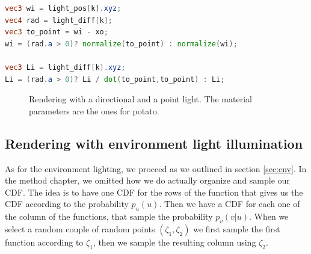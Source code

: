\begin{lstlisting}[language=GLSL,label=lst:multilighttype,caption={GLSL Code to calculate the radiance \gl{Li} and the incoming light direction \gl{wi} for the k-th directional or point light source.}]
vec3 wi = light_pos[k].xyz;
vec4 rad = light_diff[k];
vec3 to_point = wi - xo;
wi = (rad.a > 0)? normalize(to_point) : normalize(wi);

vec3 Li = light_diff[k].xyz;
Li = (rad.a > 0)? Li / dot(to_point,to_point) : Li;
\end{lstlisting}

\begin{figure}
\centering
{}
\caption{Rendering with a directional and a point light. The material parameters are the ones for potato.}
\label{fig:dir_point_comparison}
\end{figure}


\subsection{Rendering with environment light illumination}
\label{sec:envenv}
As for the environment lighting, we proceed as we outlined in section \ref{sec:env}. In the method chapter, we omitted how we do actually organize and sample our CDF. The idea is to have one CDF for the rows of the function that gives us the CDF according to the probability $p_u(u)$. Then we have a CDF for each one of the column of the functions, that sample the probability $p_v(v|u)$. When we select a random couple of random points $(\zeta_1,\zeta_2)$ we first sample the first function according to $\zeta_1$, then we sample the resulting column using $\zeta_2$.

